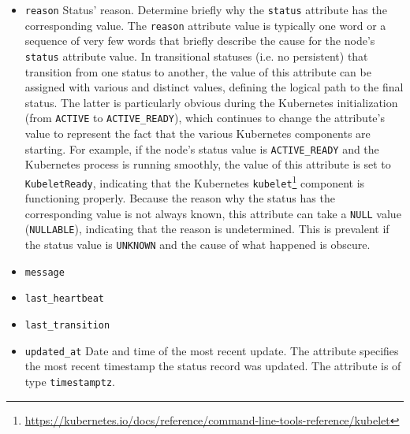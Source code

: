 \begin{itemize}
  \item \texttt{reason}
    \newline
    Status' reason.
    \newline
    Determine briefly why the \texttt{status} attribute has the corresponding value.
    The \texttt{reason} attribute value is typically one word or a sequence of very
    few words that briefly describe the cause for the node's \texttt{status}
    attribute value. In transitional statuses (i.e. no persistent) that
    transition from one status to another, the value of this attribute can be assigned
    with various and distinct values, defining the logical path to the final
    status. The latter is particularly obvious during the Kubernetes initialization
    (from \texttt{ACTIVE} to \texttt{ACTIVE\_READY}), which continues to change
    the attribute's value to represent the fact that the various Kubernetes
    components are starting. For example, if the node's status value is \texttt{ACTIVE\_READY}
    and the Kubernetes process is running smoothly, the value of this attribute
    is set to \texttt{KubeletReady}, indicating that the Kubernetes \texttt{kubelet}\footnote{\url{https://kubernetes.io/docs/reference/command-line-tools-reference/kubelet}}
    component is functioning properly.
    \newline
    Because the reason why the status has the corresponding value is not always
    known, this attribute can take a \texttt{NULL} value (\texttt{NULLABLE}),
    indicating that the reason is undetermined. This is prevalent if the status value
    is \texttt{UNKNOWN} and the cause of what happened is obscure.

  \item \texttt{message}
    \newline

  \item \texttt{last\_heartbeat}
    \newline

  \item \texttt{last\_transition}
    \newline

  \item \texttt{updated\_at}
    \newline
    Date and time of the most recent update.
    \newline
    The attribute specifies the most recent timestamp the status record was updated.
    \newline
    The attribute is of type \texttt{timestamptz}.
\end{itemize}

